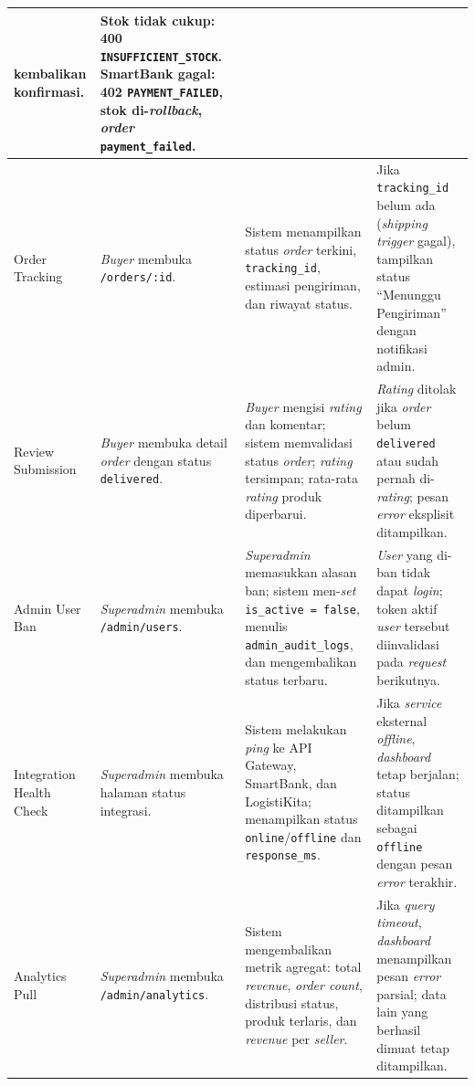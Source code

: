 \begin{longtable}{|L{2.5cm}|L{3cm}|L{5cm}|L{4cm}|}
          kembalikan konfirmasi.
        & Stok tidak cukup: 400 \texttt{INSUFFICIENT\_STOCK}. SmartBank gagal:
          402 \texttt{PAYMENT\_FAILED}, stok di-\textit{rollback}, \textit{order}
          \texttt{payment\_failed}. \\
    \hline
    Order Tracking
        & \textit{Buyer} membuka \texttt{/orders/:id}.
        & Sistem menampilkan status \textit{order} terkini, \texttt{tracking\_id},
          estimasi pengiriman, dan riwayat status.
        & Jika \texttt{tracking\_id} belum ada (\textit{shipping trigger} gagal),
          tampilkan status ``Menunggu Pengiriman'' dengan notifikasi admin. \\
    \hline
    Review Submission
        & \textit{Buyer} membuka detail \textit{order} dengan status
          \texttt{delivered}.
        & \textit{Buyer} mengisi \textit{rating} dan komentar; sistem memvalidasi
          status \textit{order}; \textit{rating} tersimpan; rata-rata
          \textit{rating} produk diperbarui.
        & \textit{Rating} ditolak jika \textit{order} belum \texttt{delivered}
          atau sudah pernah di-\textit{rating}; pesan \textit{error} eksplisit
          ditampilkan. \\
    \hline
    Admin User Ban
        & \textit{Superadmin} membuka \texttt{/admin/users}.
        & \textit{Superadmin} memasukkan alasan ban; sistem men-\textit{set}
          \texttt{is\_active = false}, menulis \texttt{admin\_audit\_logs}, dan
          mengembalikan status terbaru.
        & \textit{User} yang di-ban tidak dapat \textit{login}; token aktif
          \textit{user} tersebut diinvalidasi pada \textit{request} berikutnya. \\
    \hline
    Integration Health Check
        & \textit{Superadmin} membuka halaman status integrasi.
        & Sistem melakukan \textit{ping} ke API Gateway, SmartBank, dan
          LogistiKita; menampilkan status \texttt{online}/\texttt{offline} dan
          \texttt{response\_ms}.
        & Jika \textit{service} eksternal \textit{offline}, \textit{dashboard}
          tetap berjalan; status ditampilkan sebagai \texttt{offline} dengan pesan
          \textit{error} terakhir. \\
    \hline
    Analytics Pull
        & \textit{Superadmin} membuka \texttt{/admin/analytics}.
        & Sistem mengembalikan metrik agregat: total \textit{revenue},
          \textit{order count}, distribusi status, produk terlaris, dan
          \textit{revenue} per \textit{seller}.
        & Jika \textit{query timeout}, \textit{dashboard} menampilkan pesan
          \textit{error} parsial; data lain yang berhasil dimuat tetap
          ditampilkan. \\
    \hline
\end{longtable}
